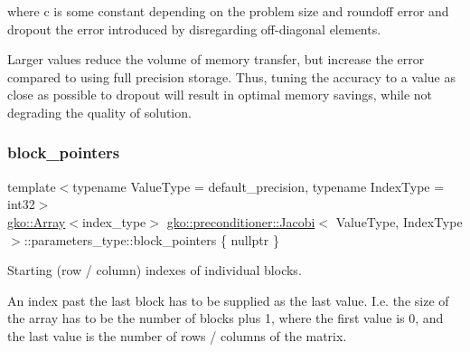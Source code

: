 where {\ttfamily c} is some constant depending on the problem size and roundoff error and {\ttfamily dropout} the error introduced by disregarding off-\/diagonal elements.

Larger values reduce the volume of memory transfer, but increase the error compared to using full precision storage. Thus, tuning the accuracy to a value as close as possible to {\ttfamily dropout} will result in optimal memory savings, while not degrading the quality of solution. \mbox{\label{structgko_1_1preconditioner_1_1Jacobi_1_1parameters__type_ab70db5d25c2efd13579170b28218ea66}} 
\subsubsection{\texorpdfstring{block\+\_\+pointers}{block\_pointers}}
{\footnotesize\ttfamily template$<$typename Value\+Type  = default\+\_\+precision, typename Index\+Type  = int32$>$ \\
\hyperlink{classgko_1_1Array}{gko\+::\+Array}$<$index\+\_\+type$>$ \hyperlink{classgko_1_1preconditioner_1_1Jacobi}{gko\+::preconditioner\+::\+Jacobi}$<$ Value\+Type, Index\+Type $>$\+::parameters\+\_\+type\+::block\+\_\+pointers \{ nullptr \}\hspace{0.3cm}{\ttfamily [mutable]}}



Starting (row / column) indexes of individual blocks. 

An index past the last block has to be supplied as the last value. I.\+e. the size of the array has to be the number of blocks plus 1, where the first value is 0, and the last value is the number of rows / columns of the matrix.

